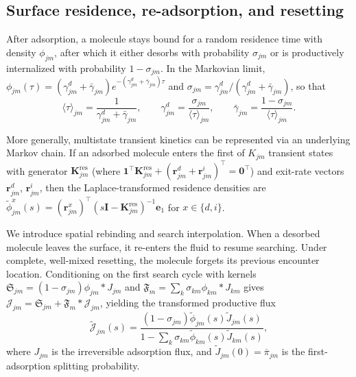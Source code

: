 \documentclass[pdflatex,sn-mathphys-num]{sn-jnl}
\numberwithin{equation}{section}
\theoremstyle{thmstyleone}%
\theoremstyle{definition}
\theoremstyle{remark}
\begin{document}
\subsection{Surface residence, re-adsorption, and resetting}
\label{subsec:surface_kinetics}

After adsorption, a molecule stays bound for a random residence time with density $\phi_{jm}$, after which it either desorbs with probability $\sigma_{jm}$ or is productively internalized with probability $1-\sigma_{jm}$. In the Markovian limit, $\phi_{jm}(\tau)=(\gamma^d_{jm}+\bar\gamma_{jm})e^{-(\gamma^d_{jm}+\bar\gamma_{jm})\tau}$ and $\sigma_{jm}=\gamma^d_{jm}/(\gamma^d_{jm}+\bar\gamma_{jm})$, so that
\begin{equation}
\langle\tau\rangle_{jm}=\frac1{\gamma^d_{jm}+\bar\gamma_{jm}},\qquad
\gamma^d_{jm}=\frac{\sigma_{jm}}{\langle\tau\rangle_{jm}},\qquad
\bar\gamma_{jm}=\frac{1-\sigma_{jm}}{\langle\tau\rangle_{jm}} .
\label{eq:kinetic}
\end{equation}

More generally, multistate transient kinetics can be represented via an underlying Markov chain. If an adsorbed molecule enters the first of $K_{jm}$ transient states with generator $\mathbf K^{\mathrm{res}}_{jm}$ (where $\mathbf 1^\top\mathbf K^{\mathrm{res}}_{jm}+(\mathbf r^d_{jm}+\mathbf r^i_{jm})^\top=\mathbf 0^\top$) and exit-rate vectors $\mathbf r^{d}_{jm}$, $\mathbf r^{i}_{jm}$, then the Laplace-transformed residence densities are $\widetilde\phi^{x}_{jm}(s)=(\mathbf r^{x}_{jm})^\top(s\mathbf I-\mathbf K^{\mathrm{res}}_{jm})^{-1}\mathbf e_1$ for $x\in\{d,i\}$.

We introduce spatial rebinding and search interpolation.
When a desorbed molecule leaves the surface, it re-enters the fluid to resume searching. Under complete, well-mixed resetting, the molecule forgets its previous encounter location. Conditioning on the first search cycle with kernels $\mathfrak S_{jm}=(1-\sigma_{jm})\phi_{jm}*J_{jm}$ and $\mathfrak F_m=\sum_k\sigma_{km}\phi_{km}*J_{km}$ gives $\mathcal J_{jm}=\mathfrak S_{jm}+\mathfrak F_m*\mathcal J_{jm}$, yielding the transformed productive flux
\begin{equation}
\widetilde{\mathcal J}_{jm}(s)
=\frac{(1-\sigma_{jm})\widetilde\phi_{jm}(s)\widetilde J_{jm}(s)}
{1-\sum_{k}\sigma_{km}\widetilde\phi_{km}(s)\widetilde J_{km}(s)} ,
\label{eq:reset}
\end{equation}
where $J_{jm}$ is the irreversible adsorption flux, and $\widetilde J_{jm}(0)=\overline\pi_{jm}$ is the first-adsorption splitting probability.
\end{document}
